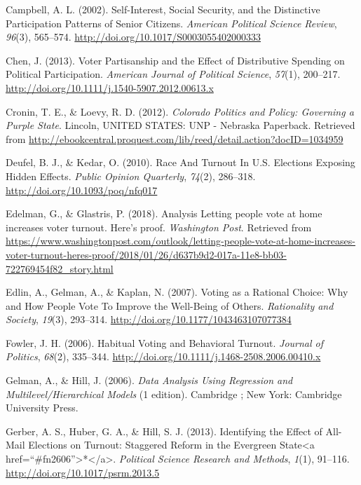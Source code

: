 \documentclass[12pt,twoside]{reedthesis}
\begin{document}
  \hypertarget{ref-campbell_self-interest_2002}{}
  Campbell, A. L. (2002). Self-Interest, Social Security, and the
  Distinctive Participation Patterns of Senior Citizens. \emph{American
  Political Science Review}, \emph{96}(3), 565--574.
  \url{http://doi.org/10.1017/S0003055402000333}
  
  \hypertarget{ref-chen_voter_2013}{}
  Chen, J. (2013). Voter Partisanship and the Effect of Distributive
  Spending on Political Participation. \emph{American Journal of Political
  Science}, \emph{57}(1), 200--217.
  \url{http://doi.org/10.1111/j.1540-5907.2012.00613.x}
  
  \hypertarget{ref-cronin_colorado_2012}{}
  Cronin, T. E., \& Loevy, R. D. (2012). \emph{Colorado Politics and
  Policy: Governing a Purple State}. Lincoln, UNITED STATES: UNP -
  Nebraska Paperback. Retrieved from
  \url{http://ebookcentral.proquest.com/lib/reed/detail.action?docID=1034959}
  
  \hypertarget{ref-deufel_race_2010}{}
  Deufel, B. J., \& Kedar, O. (2010). Race And Turnout In U.S. Elections
  Exposing Hidden Effects. \emph{Public Opinion Quarterly}, \emph{74}(2),
  286--318. \url{http://doi.org/10.1093/poq/nfq017}
  
  \hypertarget{ref-edelman_analysis_2018}{}
  Edelman, G., \& Glastris, P. (2018). Analysis Letting people vote at
  home increases voter turnout. Here's proof. \emph{Washington Post}.
  Retrieved from
  \url{https://www.washingtonpost.com/outlook/letting-people-vote-at-home-increases-voter-turnout-heres-proof/2018/01/26/d637b9d2-017a-11e8-bb03-722769454f82_story.html}
  
  \hypertarget{ref-edlin_voting_2007}{}
  Edlin, A., Gelman, A., \& Kaplan, N. (2007). Voting as a Rational
  Choice: Why and How People Vote To Improve the Well-Being of Others.
  \emph{Rationality and Society}, \emph{19}(3), 293--314.
  \url{http://doi.org/10.1177/1043463107077384}
  
  \hypertarget{ref-fowler_habitual_2006}{}
  Fowler, J. H. (2006). Habitual Voting and Behavioral Turnout.
  \emph{Journal of Politics}, \emph{68}(2), 335--344.
  \url{http://doi.org/10.1111/j.1468-2508.2006.00410.x}
  
  \hypertarget{ref-gelman_data_2006}{}
  Gelman, A., \& Hill, J. (2006). \emph{Data Analysis Using Regression and
  Multilevel/Hierarchical Models} (1 edition). Cambridge ; New York:
  Cambridge University Press.
  
  \hypertarget{ref-gerber_identifying_2013}{}
  Gerber, A. S., Huber, G. A., \& Hill, S. J. (2013). Identifying the
  Effect of All-Mail Elections on Turnout: Staggered Reform in the
  Evergreen State\textless{}a
  href=``\#fn2606''\textgreater{}*\textless{}/a\textgreater{}.
  \emph{Political Science Research and Methods}, \emph{1}(1), 91--116.
  \url{http://doi.org/10.1017/psrm.2013.5}
  
\end{document}
